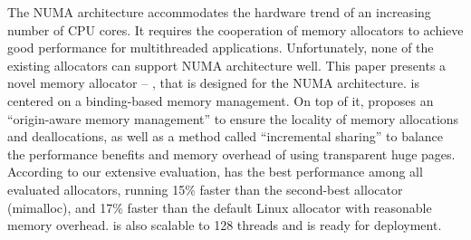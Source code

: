 The NUMA architecture accommodates the hardware trend of an increasing number of CPU cores. It requires the cooperation of memory allocators to achieve good performance for multithreaded applications. Unfortunately, none of the existing allocators can support NUMA architecture well.
This paper presents a novel memory allocator -- \NM{}, that is designed for the NUMA architecture. \NM{} is centered on a binding-based memory management. On top of it, \NM{} proposes an ``origin-aware memory management'' to ensure the locality of memory allocations and deallocations, as well as a method called ``incremental sharing'' to balance the performance benefits and memory overhead of using transparent huge pages.
According to our extensive evaluation, \NM{} has the best performance among all evaluated allocators, running 15\% faster than the second-best allocator (mimalloc), and 17\% faster than the default Linux allocator with reasonable memory overhead. 
\NM{} is also scalable to 128 threads and is ready for deployment.